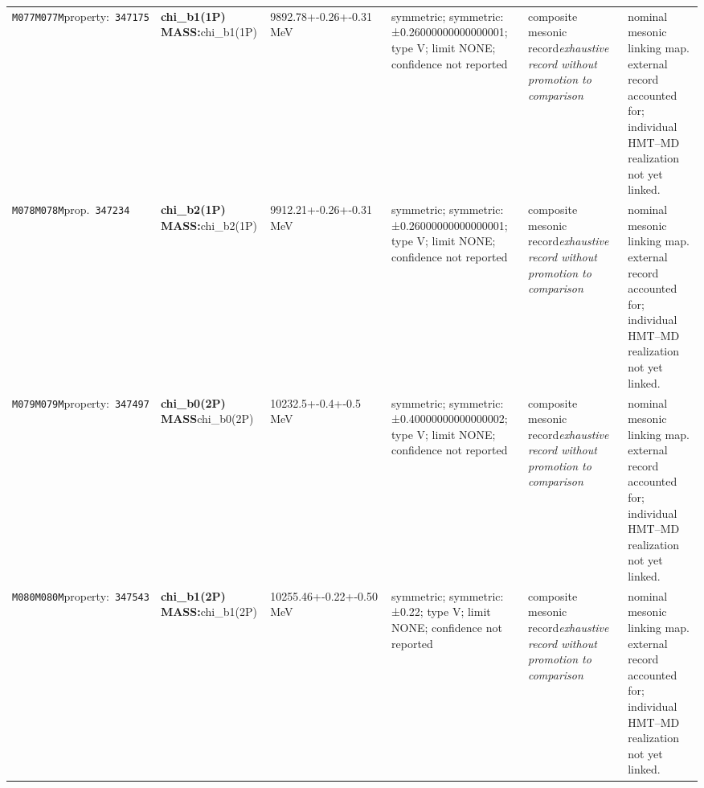 \begin{landscape}
\begin{longtable}{L{1.85cm}L{4.45cm}L{2.35cm}L{4.05cm}L{3.35cm}L{7.15cm}}
\texttt{M077}\newline \texttt{M077M}\newline property:\ \texttt{347175} & \textbf{chi\_\allowbreak{}b1(1P) MASS:}\newline chi\_\allowbreak{}b1(1P) & 9892.78+-0.26+-0.31\,MeV & symmetric; symmetric: ±0.26000000000000001; type V; limit NONE; confidence not reported & composite mesonic record\newline \emph{exhaustive record without promotion to comparison} & nominal mesonic linking map. external record accounted for; individual HMT--MD realization not yet linked. \\
\texttt{M078}\newline \texttt{M078M}\newline prop.\ \texttt{347234} & \textbf{chi\_\allowbreak{}b2(1P) MASS:}\newline chi\_\allowbreak{}b2(1P) & 9912.21+-0.26+-0.31\,MeV & symmetric; symmetric: ±0.26000000000000001; type V; limit NONE; confidence not reported & composite mesonic record\newline \emph{exhaustive record without promotion to comparison} & nominal mesonic linking map. external record accounted for; individual HMT--MD realization not yet linked. \\
\texttt{M079}\newline \texttt{M079M}\newline property:\ \texttt{347497} & \textbf{chi\_\allowbreak{}b0(2P) MASS}\newline chi\_\allowbreak{}b0(2P) & 10232.5+-0.4+-0.5\,MeV & symmetric; symmetric: ±0.40000000000000002; type V; limit NONE; confidence not reported & composite mesonic record\newline \emph{exhaustive record without promotion to comparison} & nominal mesonic linking map. external record accounted for; individual HMT--MD realization not yet linked. \\
\texttt{M080}\newline \texttt{M080M}\newline property:\ \texttt{347543} & \textbf{chi\_\allowbreak{}b1(2P) MASS:}\newline chi\_\allowbreak{}b1(2P) & 10255.46+-0.22+-0.50\,MeV & symmetric; symmetric: ±0.22; type V; limit NONE; confidence not reported & composite mesonic record\newline \emph{exhaustive record without promotion to comparison} & nominal mesonic linking map. external record accounted for; individual HMT--MD realization not yet linked. \\

\end{longtable}
\end{landscape}
